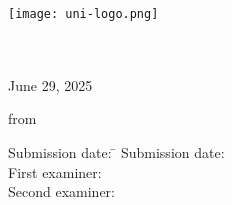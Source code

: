 \begin{titlepage}


\raggedleft

\vspace*{-4cm}

\hspace*{8cm}
\texttt{[image: uni-logo.png]}

\centering
\Large
\department  
\vspace{0.5cm}\\

\normalsize
\group \\
June 29, 2025

\vspace{1.5cm}
\LARGE
\thesistitle
\vspace{1cm}
\Large
\thesistype

\vspace*{\fill}

\Large
from

\vspace{0.5cm}
\LARGE
\student \vspace{1cm}

\vspace{1cm}

\flushleft
 \Large
\vspace*{\fill}

\begin{tabbing}
\normalsize Submission date: \= \normalsize \submissiondate \kill
\normalsize Submission date: \> \normalsize \submissiondate \\
\normalsize First examiner: \> \normalsize \prof \\
\normalsize Second examiner: \> \normalsize \scndProf
\end{tabbing}

\end{titlepage}